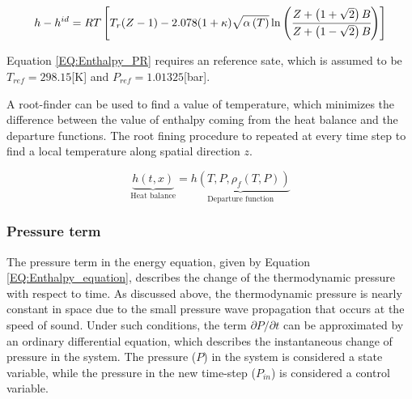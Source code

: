 \documentclass[../Article_Model_Parameters.tex]{subfiles}
\begin{document}
			{\footnotesize
				\begin{equation}
					{\color{black}h}-{\color{black}h}^{id}={\color{black}R}T \left[{\color{black}T_r}({\color{black}Z}-1) -2.078(1+{\color{black}\kappa} ){\sqrt { {\color{black}\alpha}\left(T\right) } } \ln \left(\cfrac{{\color{black}Z}+\left( 1+\sqrt{2} \right){\color{black}B}}{{\color{black}Z}+\left( 1-\sqrt{2} \right){\color{black}B}}\right)\right]
					\label{EQ:Enthalpy_PR}
			\end{equation}				
			}
		
			Equation \ref{EQ:Enthalpy_PR} requires an reference sate, which is assumed to be $T_{ref}=298.15$[K] and $P_{ref}=1.01325$[bar].
			
			A root-finder can be used to find a value of temperature, which minimizes the difference between the value of enthalpy coming from the heat balance and the departure functions. The root fining procedure to repeated at every time step to find a local temperature along spatial direction $z$.
			
			{\footnotesize
				\begin{equation}
					\underbrace{h\left(t,x\right)}_{\text{Heat balance}}=\underbrace{h\left(T,P,\rho_f\left(T,P\right)\right)}_{\text{Departure function}}
					\label{EQ:Enthalpy_root}
				\end{equation}
			}
			
			
		\subsubsection{Pressure term} \label{CH: Pressure}
		
		The pressure term in the energy equation, given by Equation \ref{EQ:Enthalpy_equation}, describes the change of the thermodynamic pressure with respect to time. As discussed above, the thermodynamic pressure is nearly constant in space due to the small pressure wave propagation that occurs at the speed of sound. Under such conditions, the term $\partial P/\partial t$ can be approximated by an ordinary differential equation, which describes the instantaneous change of pressure in the system. The pressure ($P$) in the system is considered a state variable, while the pressure in the new time-step ($P_{in}$) is considered a control variable.
		
\end{document}
